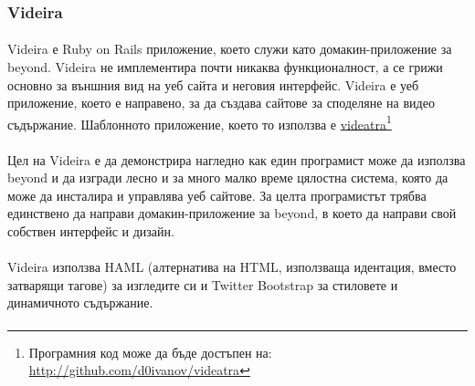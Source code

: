 \documentclass[pdftex,14pt,a4paper]{extreport}
\begin{document}
\subsubsection {Videira}
\paragraph {}
Videira е Ruby on Rails приложение, което служи като домакин-приложение за beyond. Videira не имплементира почти никаква функционалност, а се грижи основно за външния вид на уеб сайта и неговия интерфейс. Videira е уеб приложение, което е направено, за да създава сайтове за споделяне на видео съдържание. Шаблонното приложение, което то използва е \href{https://github.com/d0ivanov/videatra}{videatra}\footnote{Програмния код може да бъде достъпен на: \url{http://github.com/d0ivanov/videatra}}
\paragraph {}

Цел на Videira е да демонстрира нагледно как един програмист може да използва beyond и да изгради лесно и за много малко време цялостна система, която да може да инсталира и управлява уеб сайтове. За целта програмистът трябва единствено да направи домакин-приложение за beyond, в което да направи свой собствен интерфейс и дизайн.
\paragraph {}

Videira използва HAML (алтернатива на HTML, използваща идентация, вместо затварящи тагове) за изгледите си и Twitter Bootstrap за стиловете и динамичното съдържание.
\paragraph {}
\end{document}
